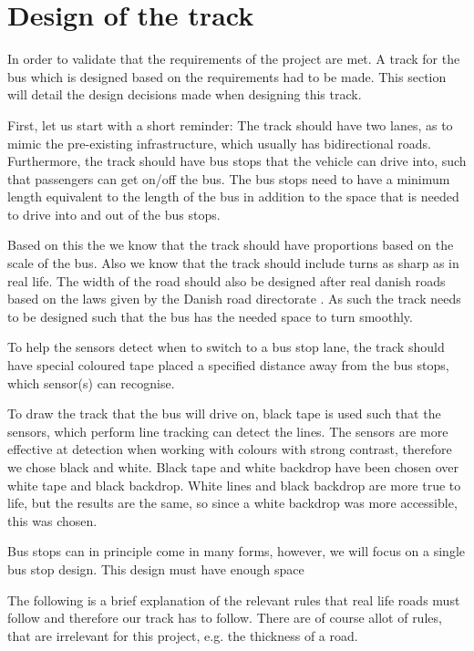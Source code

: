 \section{Design of the track}

In order to validate that the requirements of the project are met. A track for the bus which is designed based on the requirements had to be made. This section will detail the design decisions made when designing this track. 

First, let us start with a short reminder: The track should have two lanes, as to mimic the pre-existing infrastructure, which usually has bidirectional roads. Furthermore, the track should have bus stops that the vehicle can drive into, such that passengers can get on/off the bus. The bus stops need to have a minimum length equivalent to the length of the bus in addition to the space that is needed to drive into and out of the bus stops.

Based on this the we know that the track should have proportions based on the scale of the bus. Also we know that the track should include turns as sharp as in real life\cite{DriveingCurves}. The width of the road should also be designed after real danish roads based on the laws given by the Danish road directorate \cite{roadRules}.  As such the track needs to be designed such that the bus has the needed space to turn smoothly.

To help the sensors detect when to switch to a bus stop lane, the track should have special coloured tape placed a specified distance away from the bus stops, which sensor(s) can recognise.

To draw the track that the bus will drive on, black tape is used such that the sensors, which perform line tracking can detect the lines. The sensors are more effective at detection when working with colours with strong contrast, therefore we chose black and white. Black tape and white backdrop have been chosen over white tape and black backdrop. White lines and black backdrop are more true to life, but the results are the same, so since a white backdrop was more accessible, this was chosen.

Bus stops can in principle come in many forms, however, we will focus on a single bus stop design. This design must have enough space

The following is a brief explanation of the relevant rules that real life roads must follow and therefore our track has to follow. There are of course allot of rules, that are irrelevant for this project, e.g. the thickness of a road. 

